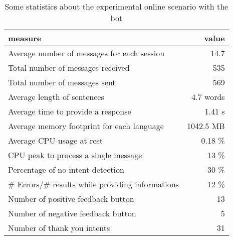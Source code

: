 
\begin{table}
  \begin{tabularx}{\textwidth}{Xr}
    \toprule
    \textbf{measure} & \textbf{value} \\
    \midrule
    Average number of messages for each session & 14.7 \\
    Total number of messages received & 535 \\
    Total number of messages sent & 569 \\
    Average length of sentences & 4.7 words \\
    Average time to provide a response & 1.41 s \\
    Average memory footprint for each language & 1042.5 MB \\
    Average CPU usage at rest & 0.18 \% \\
    CPU peak to process a single message & 13 \% \\
    Percentage of no intent detection & 30 \% \\
    \# Errors/\# results while providing informations & 12 \% \\
    Number of positive feedback button & 13 \\
    Number of negative feedback button & 5 \\
    Number of thank you intents & 31 \\
    \bottomrule
  \end{tabularx}
  \caption{Some statistics about the experimental online scenario with the bot}\label{tab:botStatistics}
\end{table}